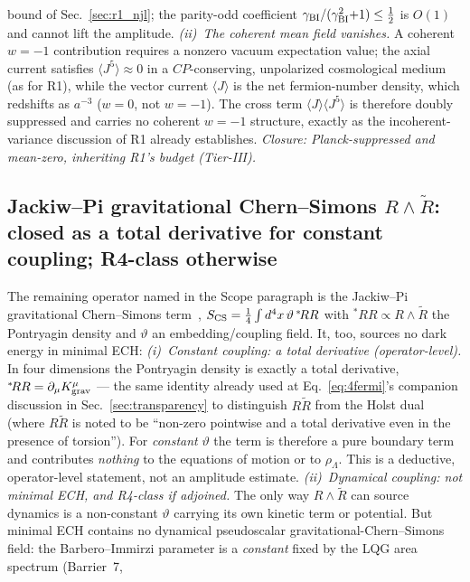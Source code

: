 \documentclass[aps,prd,twocolumn,superscriptaddress,showpacs,preprintnumbers,nofootinbib,longbibliography,floatfix]{revtex4-2}
\begin{document}
bound of Sec.~\ref{sec:r1_njl}; the parity-odd coefficient
$\gamma_{\rm BI}/(\gamma_{\rm BI}^2{+}1)\le\tfrac12$ is $O(1)$ and cannot lift
the amplitude. \emph{(ii)~The coherent mean field vanishes.} A coherent
$w=-1$ contribution requires a nonzero vacuum expectation value; the axial
current satisfies $\langle J^5\rangle\approx 0$ in a $C\!P$-conserving,
unpolarized cosmological medium (as for R1), while the vector current
$\langle J\rangle$ is the net fermion-number density, which redshifts as
$a^{-3}$ ($w=0$, not $w=-1$). The cross term $\langle J\rangle\langle J^5\rangle$
is therefore doubly suppressed and carries no coherent $w=-1$ structure, exactly
as the incoherent-variance discussion of R1 already establishes.
\emph{Closure: Planck-suppressed and mean-zero, inheriting R1's budget
(Tier-III).}

\subsection{Jackiw--Pi gravitational Chern--Simons $R\wedge\widetilde R$:
closed as a total derivative for constant coupling; R4-class otherwise}
\label{sec:jackiwpi_cs}
The remaining operator named in the Scope paragraph is the Jackiw--Pi
gravitational Chern--Simons term~\cite{JackiwPi2003},
$S_{\rm CS}=\tfrac14\int d^4x\,\vartheta\,{}^{*}\!RR$ with
${}^{*}\!RR\propto R\wedge\widetilde R$ the Pontryagin density and $\vartheta$
an embedding/coupling field. It, too, sources no dark energy in minimal ECH:
\emph{(i)~Constant coupling: a total derivative (operator-level).} In four
dimensions the Pontryagin density is exactly a total derivative,
${}^{*}\!RR=\partial_\mu K^\mu_{\rm grav}$ --- the same identity already used at
Eq.~\eqref{eq:4fermi}'s companion discussion in
Sec.~\ref{sec:transparency} to distinguish $R\widetilde R$ from the Holst dual
(where $R\widetilde R$ is noted to be ``non-zero pointwise and a total
derivative even in the presence of torsion''). For \emph{constant} $\vartheta$
the term is therefore a pure boundary term and contributes \emph{nothing} to the
equations of motion or to $\rho_\Lambda$. This is a deductive, operator-level
statement, not an amplitude estimate. \emph{(ii)~Dynamical coupling: not
minimal ECH, and R4-class if adjoined.} The only way $R\wedge\widetilde R$ can
source dynamics is a non-constant $\vartheta$ carrying its own kinetic term or
potential. But minimal ECH contains no dynamical pseudoscalar
gravitational-Chern--Simons field: the Barbero--Immirzi parameter is a
\emph{constant} fixed by the LQG area spectrum (Barrier~7,
\end{document}

